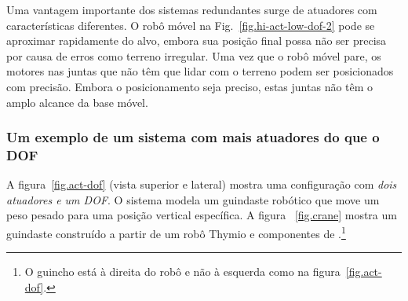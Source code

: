
Uma vantagem importante dos sistemas redundantes surge de atuadores com características diferentes. O robô móvel na Fig.~\ref{fig.hi-act-low-dof-2} pode se aproximar rapidamente do alvo, embora sua posição final possa não ser precisa por causa de erros como terreno irregular. Uma vez que o robô móvel pare, os motores nas juntas que não têm que lidar com o terreno podem ser posicionados com precisão. Embora o posicionamento seja preciso, estas juntas não têm o amplo alcance da base móvel.

\subsubsection*{Um exemplo de um sistema com mais atuadores do que o DOF}

A figura~\ref{fig.act-dof} (vista superior e lateral) mostra uma configuração com \emph{dois atuadores e um DOF}. O sistema modela um guindaste robótico que move um peso pesado para uma posição vertical específica. A figura ~\ref{fig.crane} mostra um guindaste construído a partir de um robô Thymio e componentes de \lego.\footnote{O guincho está à direita do robô e não à esquerda como na figura~\ref{fig.act-dof}.}

